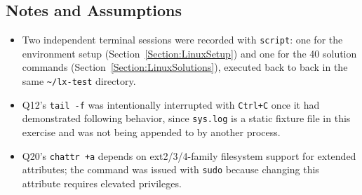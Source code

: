 \subsection{Notes and Assumptions}
\begin{itemize}
\item Two independent terminal sessions were recorded with \texttt{script}: one for the environment setup (Section~\ref{Section:LinuxSetup}) and one for the 40 solution commands (Section~\ref{Section:LinuxSolutions}), executed back to back in the same \texttt{\textasciitilde/lx-test} directory.
\item Q12's \texttt{tail -f} was intentionally interrupted with \texttt{Ctrl+C} once it had demonstrated following behavior, since \texttt{sys.log} is a static fixture file in this exercise and was not being appended to by another process.
\item Q20's \texttt{chattr +a} depends on ext2/3/4-family filesystem support for extended attributes; the command was issued with \texttt{sudo} because changing this attribute requires elevated privileges.
\end{itemize}

